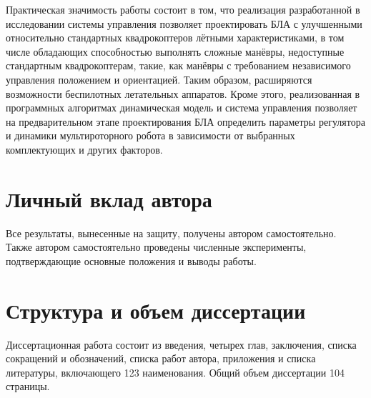 Практическая значимость работы состоит в том, что
реализация разработанной в исследовании системы управления позволяет проектировать БЛА с улучшенными относительно стандартных квадрокоптеров лётными характеристиками, в том числе обладающих способностью 
выполнять сложные манёвры, недоступные стандартным квадрокоптерам, такие, как манёвры с требованием независимого управления положением и ориентацией.
Таким образом, расширяются возможности беспилотных летательных аппаратов.
Кроме этого, реализованная в программных алгоритмах динамическая модель и система управления позволяет на предварительном этапе проектирования БЛА определить параметры регулятора и динамики мультироторного робота в зависимости от выбранных комплектующих и других факторов.

\section{Личный вклад автора}
Все результаты, вынесенные на защиту, получены автором самостоятельно.
Также автором самостоятельно проведены численные эксперименты,
подтверждающие основные положения и выводы работы. 

\section{Структура и объем диссертации}
Диссертационная работа состоит из введения, четырех глав, заключения,
списка сокращений и обозначений, списка работ автора, приложения и списка литературы,
включающего 123 наименования.
Общий объем диссертации 104 страницы.













